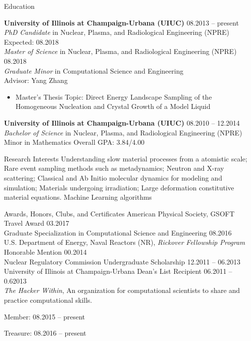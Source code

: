 \documentclass[9pt]{resume} %
\begin{document}

\begin{rSection}{Education}

{\bf University of Illinois at Champaign-Urbana (UIUC)} \hfill {08.2013 -- present} \\
{\it{PhD Candidate}} in Nuclear, Plasma, and Radiological Engineering (NPRE) \hfill{Expected: 08.2018}\\
{\it{Master of Science}} in Nuclear, Plasma, and Radiological Engineering (NPRE) \hfill{08.2018}\\
{\it{Graduate Minor}} in Computational Science and Engineering\\
Advisor: Yang Zhang
\begin{itemize}
	\item Master's Thesis Topic: Direct Energy Landscape Sampling of the Homogeneous Nucleation and Crystal Growth of a Model Liquid
\end{itemize}

{\bf University of Illinois at Champaign-Urbana (UIUC)} \hfill {08.2010 -- 12.2014} \\ 
{\it Bachelor of Science} in Nuclear, Plasma, and Radiological Engineering (NPRE) \\
Minor in Mathematics \hfill{Overall GPA: 3.84/4.00}
\end{rSection}

\begin{rSection}{Research Interests}
	Understanding slow material processes from a atomistic scale; Rare event sampling methods such as metadynamics; Neutron and X-ray scattering; Classical and Ab Initio molecular dynamics for modeling and simulation; Materials undergoing irradiation; Large deformation constitutive material equations. Machine Learning algorithms
\end{rSection}

\begin{rSection}{Awards, Honors, Clubs, and Certificates}
	American Physical Society, GSOFT Travel Award \hfill{03.2017}
	\\[3pt]
	Graduate Specialization in Computational Science and Engineering \hfill{08.2016}
	\\[3pt]
	U.S. Department of Energy, Naval Reactors (NR), {\it Rickover Fellowship Program} Honorable Mention \hfill{00.2014} 
	\\[3pt]
	{ Nuclear Regulatory Commission Undergraduate Scholarship} \hfill{12.2011 -- 06.2013}
	\\[3pt]
	University of Illinois at Champaign-Urbana Dean's List Recipient \hfill{06.2011 -- 0.62013}
	\\[3pt]
	{\it{The Hacker Within}}, An organization for computational scientists to share and practice computational skills.\\
	\strut\hfill {Member:   08.2015 -- present}\\
	\strut\hfill Treasure: 08.2016 -- present
\end{rSection}
\end{document}
